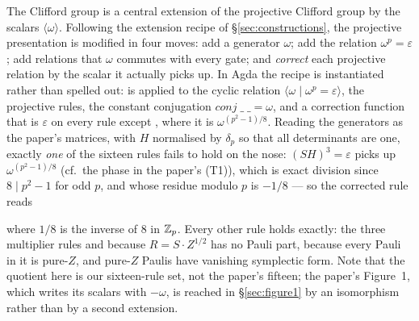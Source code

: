 The Clifford group is a central extension of the projective Clifford
group by the scalars $\langle\omega\rangle$.  Following the extension
recipe of \S\ref{sec:constructions}, the projective presentation is
modified in four moves: add a generator $\omega$; add the relation
$\omega^{p} = \varepsilon$; add relations that $\omega$ commutes with
every gate; and \emph{correct} each projective relation by the scalar it
actually picks up.  In Agda the recipe is instantiated rather than
spelled out:  is applied to the cyclic
relation $\langle \omega \mid \omega^{p} = \varepsilon\rangle$, the
projective rules, the constant conjugation $\mathit{conj}\;\_\;\_ =
\omega$, and a correction function that is $\varepsilon$ on every rule
except , where it is $\omega^{(p^2-1)/8}$.  Reading the
generators as the paper's matrices, with $H$ normalised by
$\delta_p$ so that all determinants are one, exactly \emph{one} of the
sixteen rules fails to hold on the nose: $(SH)^3 = \varepsilon$ picks
up $\omega^{(p^2-1)/8}$ (cf.\ the phase in the paper's (T1)), which is
exact division since $8 \mid p^2 - 1$ for odd $p$, and whose residue
modulo $p$ is $-1/8$ --- so the corrected rule reads
\begin{center}
\end{center}
where $1/8$ is the inverse of $8$ in $\mathbb{Z}_p$.  Every other rule holds
exactly: the three multiplier rules and  because $R = S
\cdot Z^{1/2}$ has no Pauli part,  because every Pauli in
it is pure-$Z$, and pure-$Z$ Paulis have vanishing symplectic form.  Note that the quotient here is
our sixteen-rule set, not the paper's fifteen; the paper's Figure~1,
which writes its scalars with $-\omega$, is reached in
\S\ref{sec:figure1} by an isomorphism rather than by a second
extension.

